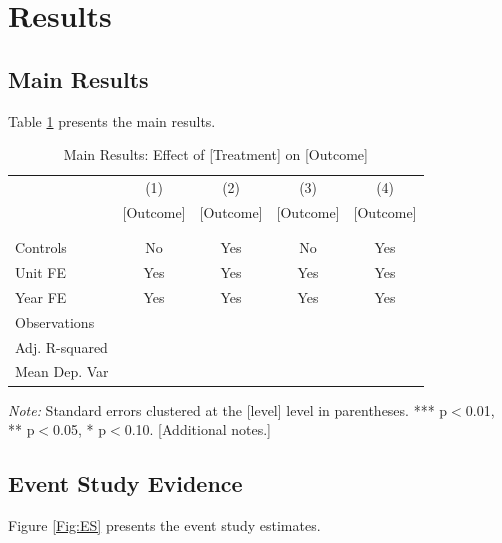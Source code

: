 \section{Results}
\label{sec:results}

\subsection{Main Results}

Table \ref{Table-Main} presents the main results.

\begin{table}[H]
\normalsize
\centering
\caption{Main Results: Effect of [Treatment] on [Outcome]}\label{Table-Main}
\setlength{\tabcolsep}{2pt}
\begin{threeparttable}
\begin{tabular}{@{}lcccc@{}}
\toprule
\midrule
         & (1)   & (2)    & (3)   & (4)    \\
         & [Outcome]  & [Outcome]  & [Outcome]  & [Outcome]  \\
\midrule
[Treatment]   & & & & \\
              & & & & \\
\midrule
Controls     & No  & Yes & No  & Yes \\
Unit FE      & Yes & Yes & Yes & Yes \\
Year FE      & Yes & Yes & Yes & Yes \\
Observations & & & & \\
Adj. R-squared & & & & \\
Mean Dep. Var  & & & & \\
\midrule
\bottomrule
\end{tabular}
\begin{tablenotes}[flushleft]
\item \footnotesize \textit{Note:} Standard errors clustered at the [level] level in parentheses. *** p$<$0.01, ** p$<$0.05, * p$<$0.10. [Additional notes.]
\end{tablenotes}
\end{threeparttable}
\end{table}


\subsection{Event Study Evidence}

Figure \ref{Fig:ES} presents the event study estimates.

